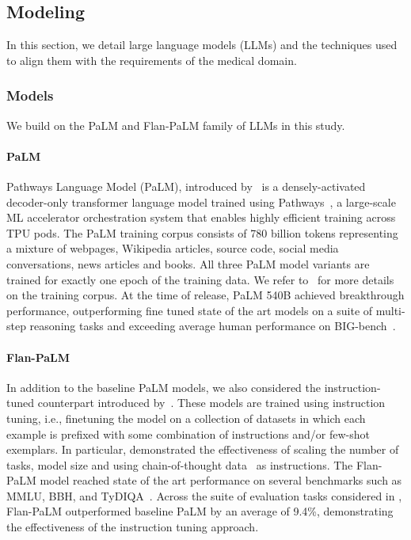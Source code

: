 \subsection{Modeling}
\label{sec:large_language_models_and_techniques}

In this section, we detail large language models (LLMs) and the techniques used to align them with the requirements of the medical domain.

\subsubsection{Models}
\label{sec:models}
We build on the PaLM and Flan-PaLM family of LLMs in this study.

\paragraph{PaLM}  Pathways Language Model (PaLM), introduced by~\cite{chowdhery2022palm} is a densely-activated decoder-only transformer language model trained using Pathways~\cite{barham2022pathways}, a large-scale ML accelerator orchestration system that enables highly efficient training across TPU pods. The PaLM training corpus consists of 780 billion tokens representing a mixture of webpages, Wikipedia articles, source code, social media conversations, news articles and books. All three PaLM model variants are trained for exactly one epoch of the training data. We refer to~\cite{chowdhery2022palm,thoppilan2022lamda,du2022glam} for more details on the training corpus. At the time of release, PaLM 540B achieved breakthrough performance, outperforming fine tuned state of the art models on a suite of multi-step reasoning tasks and exceeding average human performance on BIG-bench~\cite{srivastava2022beyond,chowdhery2022palm}.

\paragraph{Flan-PaLM} In addition to the baseline PaLM models, we also considered the instruction-tuned counterpart introduced by~\cite{chung2022scaling}. These models are trained using instruction tuning, i.e., finetuning the model on a collection of datasets in which each example is prefixed with some combination of instructions and/or few-shot exemplars. In particular, \citet{chung2022scaling} demonstrated the effectiveness of scaling the number of tasks, model size and using chain-of-thought data~\cite{wei2022chain} as instructions. The Flan-PaLM model reached state of the art performance on several benchmarks such as MMLU, BBH, and TyDIQA~\cite{clark2020tydi}. Across the suite of evaluation tasks considered in \cite{chung2022scaling}, Flan-PaLM outperformed baseline PaLM by an average of 9.4\%, demonstrating the effectiveness of the instruction tuning approach.

